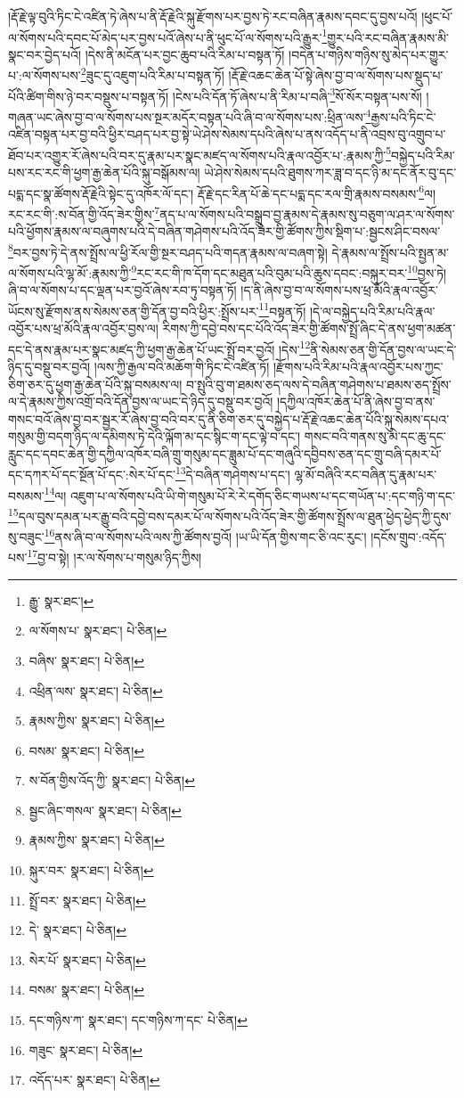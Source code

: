།རྡོ་རྗེ་ལྟ་བུའི་ཏིང་ངེ་འཛིན་ཏེ་ཞེས་པ་ནི་རྡོ་རྗེའི་སྐུ་རྫོགས་པར་བྱས་ཏེ་རང་བཞིན་རྣམས་དབང་དུ་བྱས་པའོ། །ཕུང་པོ་ལ་སོགས་པའི་དབང་པོ་མེད་པར་བྱས་པའོ་ཞེས་པ་ནི་ཕུང་པོ་ལ་སོགས་པའི་རྒྱུར་\footnote{རྒྱུ་  སྣར་ཐང་། }གྱུར་པའི་རང་བཞིན་རྣམས་མི་སྣང་བར་བྱེད་པའོ། །དེས་ནི་མངོན་པར་བྱང་ཆུབ་པའི་རིམ་པ་བསྟན་ཏོ། །བདེན་པ་གཉིས་གཉིས་སུ་མེད་པར་གྱུར་པ་:ལ་སོགས་པས་\footnote{ལ་སོགས་པ་  སྣར་ཐང་།  པེ་ཅིན། }ཟུང་དུ་འཇུག་པའི་རིམ་པ་བསྟན་ཏོ། །རྡོ་རྗེ་འཆང་ཆེན་པོ་སྟེ་ཞེས་བྱ་བ་ལ་སོགས་པས་སྡུད་པ་པོའི་ཚིག་གིས་ཉེ་བར་བསྡུས་པ་བསྟན་ཏོ། །ངེས་པའི་དོན་ཏོ་ཞེས་པ་ནི་རིམ་པ་བཞི་\footnote{བཞིས་  སྣར་ཐང་།  པེ་ཅིན། }སོ་སོར་བསྟན་པས་སོ། །གཞན་ཡང་ཞེས་བྱ་བ་ལ་སོགས་པས་སྔར་མདོར་བསྟན་པའི་ཞི་བ་ལ་སོགས་པས་:ཕྲིན་ལས་\footnote{འཕྲིན་ལས་  སྣར་ཐང་།  པེ་ཅིན། }རྒྱས་པའི་ཏིང་ངེ་འཛིན་བསྟན་པར་བྱ་བའི་ཕྱིར་བཤད་པར་བྱ་སྟེ་ཡེ་ཤེས་སེམས་དཔའི་ཞེས་པ་ནས་འདོད་པ་ནི་འབྲས་བུ་འགྲུབ་པ་ཐོབ་པར་འགྱུར་རོ་ཞེས་པའི་བར་དུ་རྣམ་པར་སྣང་མཛད་ལ་སོགས་པའི་རྣལ་འབྱོར་པ་:རྣམས་ཀྱི་\footnote{རྣམས་ཀྱིས་  སྣར་ཐང་།  པེ་ཅིན། }བསྐྱེད་པའི་རིམ་པས་རང་རང་གི་ཕྱག་རྒྱ་ཆེན་པོའི་སྐུ་བསྒོམས་ལ། ཡེ་ཤེས་སེམས་དཔའི་ཐུགས་ཀར་ཟླ་བ་དང་ཉི་མ་དང་ནོར་བུ་དང་པདྨ་དང་སྣ་ཚོགས་རྡོ་རྗེའི་སྟེང་དུ་འཁོར་ལོ་དང་། རྡོ་རྗེ་དང་རིན་པོ་ཆེ་དང་པདྨ་དང་རལ་གྲི་རྣམས་བསམས་\footnote{བསམ་  སྣར་ཐང་།  པེ་ཅིན། }ལ། རང་རང་གི་:ས་བོན་གྱི་འོད་ཟེར་གྱིས་\footnote{ས་བོན་གྱིས་འོད་ཀྱི་  སྣར་ཐང་།  པེ་ཅིན། }ནད་པ་ལ་སོགས་པའི་བསྒྲུབ་བྱ་རྣམས་དེ་རྣམས་སུ་བཅུག་ལ་ཤར་ལ་སོགས་པའི་ཕྱོགས་རྣམས་ལ་བཞུགས་པའི་དེ་བཞིན་གཤེགས་པའི་འོད་ཟེར་གྱི་ཚོགས་ཀྱིས་སྡིག་པ་:སྦྱངས་ཤིང་བསལ་\footnote{སྦྱང་ཞིང་གསལ་  སྣར་ཐང་།  པེ་ཅིན། }བར་བྱས་ཏེ་དེ་ནས་སྤྲོས་ལ་ཕྱི་རོལ་གྱི་སྔར་བཤད་པའི་གདན་རྣམས་ལ་བཞག་སྟེ། དེ་རྣམས་ལ་སྤྲོས་པའི་སྤྱན་མ་ལ་སོགས་པའི་ལྷ་མོ་:རྣམས་ཀྱི་\footnote{རྣམས་ཀྱིས་  སྣར་ཐང་།  པེ་ཅིན། }རང་རང་གི་ཁ་དོག་དང་མཐུན་པའི་བུམ་པའི་ཆུས་དབང་:བསྐུར་བར་\footnote{སྐུར་བར་  སྣར་ཐང་།  པེ་ཅིན། }བྱས་ཏེ། ཞི་བ་ལ་སོགས་པ་དང་ལྡན་པར་བྱའོ་ཞེས་རབ་ཏུ་བསྟན་ཏོ། །ད་ནི་ཞེས་བྱ་བ་ལ་སོགས་པས་ཕྲ་མོའི་རྣལ་འབྱོར་ཡོངས་སུ་རྫོགས་ནས་སེམས་ཅན་གྱི་དོན་བྱ་བའི་ཕྱིར་:སྤྲོས་པར་\footnote{སྤྲོ་བར་  སྣར་ཐང་།  པེ་ཅིན། }བསྟན་ཏོ། །དེ་ལ་བསྐྱེད་པའི་རིམ་པའི་རྣལ་འབྱོར་པས་ཕྲ་མོའི་རྣལ་འབྱོར་བྱས་ལ། རིགས་ཀྱི་དབྱེ་བས་དང་པོའི་འོད་ཟེར་གྱི་ཚོགས་སྤྲོ་ཞིང་དེ་ནས་ཕྱག་མཚན་དང་དེ་ནས་རྣམ་པར་སྣང་མཛད་ཀྱི་ཕྱག་རྒྱ་ཆེན་པོ་ཡང་སྤྲོ་བར་བྱའོ། །དེས་\footnote{དེ་  སྣར་ཐང་།  པེ་ཅིན། }ནི་སེམས་ཅན་གྱི་དོན་བྱས་ལ་ཡང་དེ་ཉིད་དུ་བསྡུ་བར་བྱའོ། །ལས་ཀྱི་རྒྱལ་བའི་མཆོག་གི་ཏིང་ངེ་འཛིན་ཏོ། །རྫོགས་པའི་རིམ་པའི་རྣལ་འབྱོར་པས་ཀྱང་ཅིག་ཅར་དུ་ཕྱག་རྒྱ་ཆེན་པོའི་སྐུ་བསམས་ལ། བ་སྤུའི་བུ་ག་ཐམས་ཅད་ལས་དེ་བཞིན་གཤེགས་པ་ཐམས་ཅད་སྤྲོས་ལ་དེ་རྣམས་ཀྱིས་འགྲོ་བའི་དོན་བྱས་ལ་ཡང་དེ་ཉིད་དུ་བསྡུ་བར་བྱའོ། །དཀྱིལ་འཁོར་ཆེན་པོ་ནི་ཞེས་བྱ་བ་ནས་གསང་བའོ་ཞེས་བྱ་བར་སྦྱར་རོ་ཞེས་བྱ་བའི་བར་དུ་ནི་ཅིག་ཅར་དུ་བསྐྱེད་པ་རྡོ་རྗེ་འཆང་ཆེན་པོའི་སྐུ་སེམས་དཔའ་གསུམ་གྱི་བདག་ཉིད་ལ་དམིགས་ཏེ་དེའི་ལྐོག་མ་དང་སྙིང་ག་དང་ལྟེ་བ་དང་། གསང་བའི་གནས་སུ་མེ་དང་ཆུ་དང་རླུང་དང་དབང་ཆེན་གྱི་དཀྱིལ་འཁོར་བཞི་གྲུ་གསུམ་དང་ཟླུམ་པོ་དང་གཞུའི་དབྱིབས་ཅན་དང་གྲུ་བཞི་དམར་པོ་དང་དཀར་པོ་དང་སྔོན་པོ་དང་:སེར་པོ་དང་\footnote{སེར་པོ་  སྣར་ཐང་།  པེ་ཅིན། }དེ་བཞིན་གཤེགས་པ་དང་། ལྷ་མོ་བཞིའི་རང་བཞིན་དུ་རྣམ་པར་བསམས་\footnote{བསམ་  སྣར་ཐང་།  པེ་ཅིན། }ལ། འཇུག་པ་ལ་སོགས་པའི་ཡི་གེ་གསུམ་པོ་རེ་རེ་དགོད་ཅིང་གཡས་པ་དང་གཡོན་པ་:དང་གཉི་ག་དང་\footnote{དང་གཉིས་ཀ་  སྣར་ཐང་། དང་གཉིས་ཀ་དང་  པེ་ཅིན། }དལ་བུས་དམན་པར་རྒྱུ་བའི་དབྱེ་བས་དམར་པོ་ལ་སོགས་པའི་འོད་ཟེར་གྱི་ཚོགས་སྤྲོས་ལ་ཐུན་ཕྱེད་ཕྱེད་ཀྱི་དུས་སུ་བཟུང་\footnote{གཟུང་  སྣར་ཐང་།  པེ་ཅིན། }ནས་ཞི་བ་ལ་སོགས་པའི་ལས་ཀྱི་ཚོགས་བྱའོ། །ཡ་ཡི་དོན་གྱིས་གང་ཅི་འང་རུང་། །དངོས་གྲུབ་:འདོད་པས་\footnote{འདོད་པར་  སྣར་ཐང་།  པེ་ཅིན། }བྱ་བ་སྟེ། །ར་ལ་སོགས་པ་གསུམ་ཉིད་ཀྱིས། 